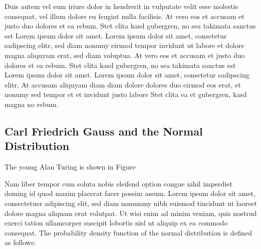 \documentclass[11pt,twoside,a4paper,titlepage]{article}
\begin{document}

Duis autem vel eum iriure dolor in hendrerit in vulputate velit esse molestie consequat, vel illum dolore eu feugiat nulla facilisis. At vero eos et accusam et justo duo dolores et ea rebum. Stet clita kasd gubergren, no sea takimata sanctus est Lorem ipsum dolor sit amet. Lorem ipsum dolor sit amet, consetetur sadipscing elitr, sed diam nonumy eirmod tempor invidunt ut labore et dolore magna aliquyam erat, sed diam voluptua. At vero eos et accusam et justo duo dolores et ea rebum. Stet clita kasd gubergren, no sea takimata sanctus est Lorem ipsum dolor sit amet. Lorem ipsum dolor sit amet, consetetur sadipscing elitr, At accusam aliquyam diam diam dolore dolores duo eirmod eos erat, et nonumy sed tempor et et invidunt justo labore Stet clita ea et gubergren, kasd magna no rebum.

\subsection{Carl Friedrich Gauss and the Normal Distribution}

The young Alan Turing is shown in Figure %


Nam liber tempor cum soluta nobis eleifend option congue nihil imperdiet doming id quod mazim placerat facer possim assum. Lorem ipsum dolor sit amet, consectetuer adipiscing elit, sed diam nonummy nibh euismod tincidunt ut laoreet dolore magna aliquam erat volutpat. Ut wisi enim ad minim veniam, quis nostrud exerci tation ullamcorper suscipit lobortis nisl ut aliquip ex ea commodo consequat. The probability density function of the normal distribution is defined as follows:
\end{document}
